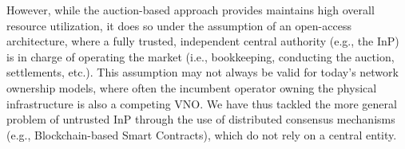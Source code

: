 However, while the auction-based approach provides maintains high overall resource utilization, it does so under the assumption of an open-access architecture, where a fully trusted, independent central authority (e.g., the \ac{InP}) is in charge of operating the market (i.e., bookkeeping, conducting the auction, settlements, etc.). This assumption may not always be valid for today's network ownership models, where often the incumbent operator owning the physical infrastructure is also a competing \ac{VNO}.
We have thus tackled the more general problem of untrusted \ac{InP} through the use of distributed consensus mechanisms (e.g., Blockchain-based Smart Contracts), which do not rely on a central entity. %

